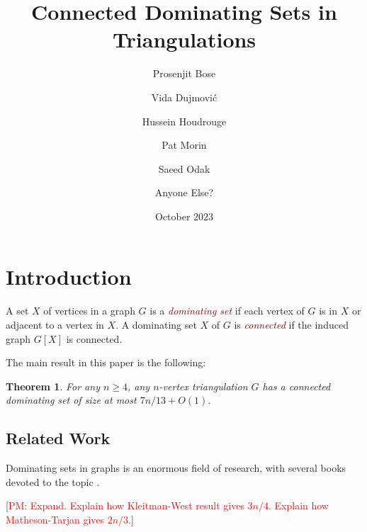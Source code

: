 \documentclass[12pt]{article}
\title{Connected Dominating Sets in Triangulations}
\author{Prosenjit Bose \and Vida Dujmović \and Hussein Houdrouge \and Pat Morin \and Saeed Odak \and Anyone Else?}
\date{October 2023}
\newtheorem{thm}{Theorem}
\newcommand{\defin}[1]{\emph{\textcolor{Maroon}{#1}}}
\newcommand{\pat}[1]{[\textcolor{red}{PM: #1}]}
\begin{document}
\maketitle



\section{Introduction}

A set $X$ of vertices in a graph $G$ is a \defin{dominating set} if each vertex of $G$ is in $X$ or adjacent to a vertex in $X$.  A dominating set $X$ of $G$ is \defin{connected} if the induced graph $G[X]$ is connected.


The main result in this paper is the following:

\begin{thm}\label{main_result2}
  For any $n\ge 4$, any $n$-vertex triangulation $G$ has a connected dominating set of size at most $7n/13 + O(1)$.
\end{thm}

\subsection{Related Work}

Dominating sets in graphs is an enormous field of research, with several books  devoted to the topic \cite{haynes.hedetniemi.ea:domination,haynes.hedetniemi.ea:topics}.

\pat{Expand.  Explain how Kleitman-West result gives $3n/4$.  Explain how Matheson-Tarjan gives $2n/3$.}


\end{document}
